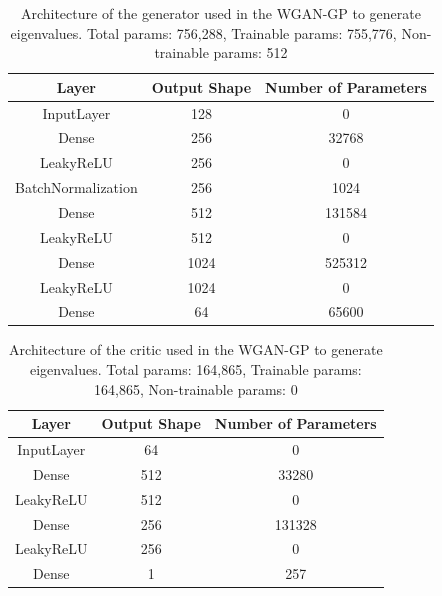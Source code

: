 \documentclass[11pt,a4paper,twoside]{report}
\begin{document}
\begin{table}[]
  \centering
  \begin{tabular}{c c c}
      \hline
      \textbf{Layer} & \textbf{Output Shape} & \textbf{Number of Parameters} \\ \hline
      InputLayer            & 128           & 0                 \\ 
      Dense                 & 256           & 32768             \\ 
      LeakyReLU             & 256           & 0                 \\ 
      BatchNormalization    & 256           & 1024              \\ 
      Dense                 & 512           & 131584            \\ 
      LeakyReLU             & 512           & 0                 \\ 
      Dense                 & 1024          & 525312            \\ 
      LeakyReLU             & 1024          & 0                 \\ 
      Dense                 & 64            & 65600             \\ 
      \end{tabular}
  \caption{Architecture of the generator used in the WGAN-GP to generate eigenvalues. Total params: 756,288, Trainable params: 755,776, Non-trainable params: 512}
  \label{tab:evals_generator_WGANGP_architecture}
\end{table}

\begin{table}[]
  \centering
  \begin{tabular}{c c c}
      \hline
      \textbf{Layer} & \textbf{Output Shape} & \textbf{Number of Parameters} \\ \hline
      InputLayer            & 64            & 0                 \\
      Dense                 & 512           & 33280             \\
      LeakyReLU             & 512           & 0                 \\
      Dense                 & 256           & 131328            \\
      LeakyReLU             & 256           & 0                 \\
      Dense                 & 1             & 257               \\
  \end{tabular}
  \caption{Architecture of the critic used in the WGAN-GP to generate eigenvalues. Total params: 164,865, Trainable params: 164,865, Non-trainable params: 0}
  \label{tab:evals_critic_WGANGP_architecture}
\end{table}
\end{document}

